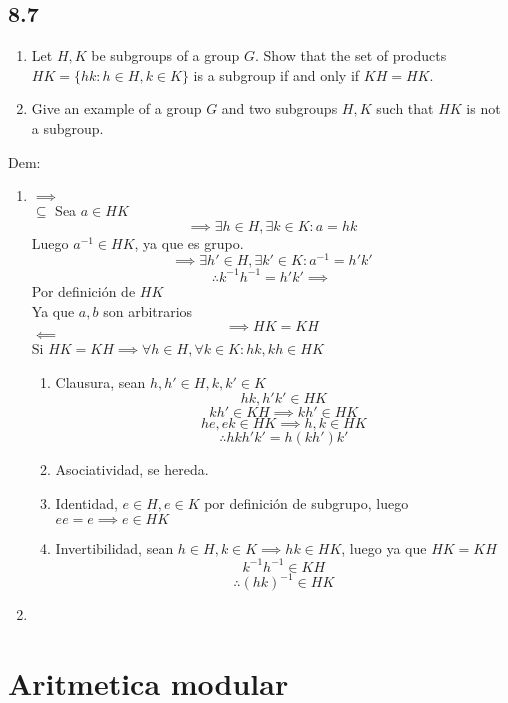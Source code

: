 \documentclass[11pt]{article}
\begin{document}
\subsection*{8.7}
\begin{enumerate}[label=(\alph*)]
	\item Let $H,K$ be subgroups of a group $G$. Show that the set of products $HK=\{hk:h\in H,k\in K\}$ is a subgroup if and only if $KH=HK$.
	
	\item Give an example of a group $G$ and two subgroups $H,K$ such that $HK$ is not a subgroup.
\end{enumerate}
Dem:
\begin{enumerate}[label=(\alph*)]
	\item $\implies$\\
	$\subseteq$
	Sea $a\in HK$
	\[\implies \exists h\in H,\exists k\in K: a=hk\]
	Luego $a^{-1}\in HK$, ya que es grupo.
	\[\implies\exists h'\in H,\exists k'\in K: a^{-1}=h'k' \]
	\[\therefore k^{-1}h^{-1}=h'k'\implies \]
	Por definición de $HK$
	\[ \]
	Ya que $a,b$ son arbitrarios
	\[\implies HK=KH\]
	$\impliedby$\\
	Si $HK=KH\implies \forall h\in H,\forall k\in K: hk,kh\in HK$
	\begin{enumerate}[label=\arabic*.]
		\item Clausura, sean $h,h'\in H,k,k'\in K$
		\[ hk,h'k'\in HK\]
		\[ kh'\in KH\implies kh'\in HK\]
		\[ he,ek\in HK\implies h,k\in HK\]
		\[\therefore hkh'k'=h(kh')k'\]
		
		\item Asociatividad, se hereda.
		
		\item Identidad, $e\in H, e\in K$ por definición de subgrupo, luego $ee=e\implies e\in HK$
		
		\item Invertibilidad, sean $h\in H,k\in K\implies hk\in HK$, luego ya que $HK=KH$
		\[k^{-1}h^{-1}\in KH\]
		\[\therefore (hk)^{-1}\in HK\]
	\end{enumerate}
	\item
\end{enumerate}
\section{Aritmetica modular}
\end{document}
